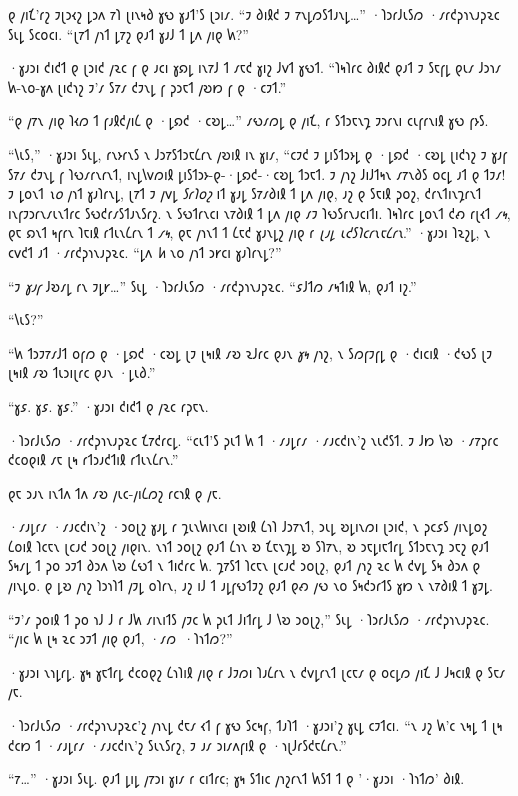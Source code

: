 𐑞 𐑢𐑦𐑗'𐑩𐑟 𐑲𐑚𐑮𐑬𐑟 𐑛𐑮𐑵 𐑳𐑐 𐑚𐑦𐑯𐑰𐑔 𐑣𐑻 𐑣𐑨𐑑'𐑕 𐑚𐑮𐑦𐑥. “𐑲 𐑔𐑦𐑙𐑒 𐑲 𐑳𐑯𐑛𐑼𐑕𐑑𐑨𐑯𐑛…” ·𐑐𐑮𐑩𐑓𐑧𐑕𐑼 ·𐑥𐑩𐑒𐑜𐑪𐑯𐑨𐑜𐑷𐑤 𐑕𐑧𐑛 𐑕𐑤𐑴𐑤𐑦. “𐑚𐑳𐑑 𐑢𐑪𐑑 𐑛𐑳𐑟 𐑞𐑨𐑑 𐑣𐑨𐑓 𐑑 𐑛𐑵 𐑢𐑦𐑞 𐑿?”

·𐑣𐑨𐑮𐑦 𐑒𐑦𐑒𐑑 𐑞 𐑚𐑮𐑦𐑒 𐑢𐑷𐑤 𐑝 𐑞 𐑨𐑤𐑦 𐑣𐑸𐑛 𐑦𐑯𐑳𐑓 𐑑 𐑥𐑱𐑒 𐑣𐑦𐑟 𐑓𐑫𐑑 𐑣𐑻𐑑. “𐑐𐑰𐑐𐑩𐑤 𐑔𐑦𐑙𐑒 𐑞𐑨𐑑 𐑲 𐑕𐑱𐑝𐑛 𐑞𐑧𐑥 𐑓𐑮𐑪𐑥 𐑿-𐑯𐑴-𐑣𐑵 𐑚𐑦𐑒𐑪𐑟 𐑲'𐑥 𐑕𐑳𐑥 𐑒𐑲𐑯𐑛 𐑝 𐑜𐑮𐑱𐑑 𐑢𐑹𐑽 𐑝 𐑞 ·𐑤𐑲𐑑.”

“𐑞 𐑢𐑳𐑯 𐑢𐑦𐑞 𐑐𐑬𐑼 𐑑 𐑝𐑨𐑙𐑒𐑢𐑦𐑖 𐑞 ·𐑛𐑸𐑒 ·𐑤𐑹𐑛…” 𐑥𐑻𐑥𐑼𐑛 𐑞 𐑢𐑦𐑗, 𐑩 𐑕𐑑𐑮𐑱𐑯𐑡 𐑲𐑮𐑩𐑯𐑦 𐑤𐑧𐑝𐑩𐑯𐑦𐑙 𐑣𐑻 𐑝𐑶𐑕.

“𐑘𐑧𐑕,” ·𐑣𐑨𐑮𐑦 𐑕𐑧𐑛, 𐑩𐑯𐑶𐑩𐑯𐑕 𐑯 𐑓𐑮𐑳𐑕𐑑𐑮𐑱𐑖𐑩𐑯 𐑢𐑹𐑦𐑙 𐑦𐑯 𐑣𐑦𐑥, “𐑤𐑲𐑒 𐑲 𐑛𐑦𐑕𐑑𐑮𐑶𐑛 𐑞 ·𐑛𐑸𐑒 ·𐑤𐑹𐑛 𐑚𐑦𐑒𐑪𐑟 𐑲 𐑣𐑨𐑝 𐑕𐑳𐑥 𐑒𐑲𐑯𐑛 𐑝 𐑐𐑻𐑥𐑩𐑯𐑩𐑯𐑑, 𐑦𐑯𐑛𐑘𐑫𐑼𐑦𐑙 𐑛𐑦𐑕𐑑𐑮𐑶-𐑞-·𐑛𐑸𐑒-·𐑤𐑹𐑛 𐑑𐑮𐑱𐑑. 𐑲 𐑢𐑪𐑟 𐑓𐑦𐑓𐑑𐑰𐑯 𐑥𐑳𐑯𐑔𐑕 𐑴𐑤𐑛 𐑨𐑑 𐑞 𐑑𐑲𐑥! 𐑲 𐑛𐑴𐑯𐑑 \emph{𐑯𐑴} 𐑢𐑪𐑑 𐑣𐑨𐑐𐑩𐑯𐑛, 𐑚𐑳𐑑 𐑲 𐑢𐑫𐑛 \emph{𐑕𐑩𐑐𐑴𐑟} 𐑦𐑑 𐑣𐑨𐑛 𐑕𐑳𐑥𐑔𐑦𐑙 𐑑 𐑛𐑵 𐑢𐑦𐑞, 𐑨𐑟 𐑞 𐑕𐑱𐑦𐑙 𐑜𐑴𐑟, 𐑒𐑩𐑯𐑑𐑦𐑯𐑡𐑩𐑯𐑑 𐑦𐑯𐑝𐑲𐑮𐑩𐑯𐑥𐑧𐑯𐑑𐑩𐑤 𐑕𐑻𐑒𐑩𐑥𐑕𐑑𐑨𐑯𐑕𐑩𐑟. 𐑯 𐑕𐑻𐑑𐑩𐑯𐑤𐑦 𐑯𐑳𐑔𐑦𐑙 𐑑 𐑛𐑵 𐑢𐑦𐑞 𐑥𐑲 𐑐𐑻𐑕𐑩𐑯𐑨𐑤𐑦𐑑𐑦. 𐑐𐑰𐑐𐑩𐑤 𐑛𐑴𐑯𐑑 𐑒𐑺 𐑩𐑚𐑬𐑑 \emph{𐑥𐑰}, 𐑞𐑱 𐑸𐑯𐑑 𐑰𐑝𐑩𐑯 𐑐𐑱𐑦𐑙 𐑩𐑑𐑧𐑯𐑖𐑩𐑯 𐑑 \emph{𐑥𐑰}, 𐑞𐑱 𐑢𐑪𐑯𐑑 𐑑 𐑖𐑱𐑒 𐑣𐑨𐑯𐑛𐑟 𐑢𐑦𐑞 𐑩 \emph{𐑚𐑨𐑛 𐑧𐑒𐑕𐑐𐑤𐑩𐑯𐑱𐑖𐑩𐑯}.” ·𐑣𐑨𐑮𐑦 𐑐𐑷𐑟𐑛, 𐑯 𐑤𐑫𐑒𐑑 𐑨𐑑 ·𐑥𐑩𐑒𐑜𐑪𐑯𐑨𐑜𐑷𐑤. “𐑛𐑵 \emph{𐑿} 𐑯𐑴 𐑢𐑪𐑑 𐑮𐑾𐑤𐑦 𐑣𐑨𐑐𐑩𐑯𐑛?”

“𐑲 \emph{𐑣𐑨𐑝} 𐑓𐑹𐑥𐑛 𐑩𐑯 𐑲𐑛𐑾…” 𐑕𐑧𐑛 ·𐑐𐑮𐑩𐑓𐑧𐑕𐑼 ·𐑥𐑩𐑒𐑜𐑪𐑯𐑨𐑜𐑷𐑤. “𐑭𐑓𐑑𐑼 𐑥𐑰𐑑𐑦𐑙 𐑿, 𐑞𐑨𐑑 𐑦𐑟.”

“𐑘𐑧𐑕?”

“𐑿 𐑑𐑮𐑲𐑳𐑥𐑓𐑑 𐑴𐑝𐑼 𐑞 ·𐑛𐑸𐑒 ·𐑤𐑹𐑛 𐑚𐑲 𐑚𐑰𐑦𐑙 𐑥𐑹 𐑷𐑓𐑩𐑤 𐑞𐑨𐑯 \emph{𐑣𐑰} 𐑢𐑪𐑟, 𐑯 𐑕𐑼𐑝𐑲𐑝𐑛 𐑞 ·𐑒𐑦𐑤𐑦𐑙 ·𐑒𐑻𐑕 𐑚𐑲 𐑚𐑰𐑦𐑙 𐑥𐑹 𐑑𐑧𐑮𐑦𐑚𐑩𐑤 𐑞𐑨𐑯 ·𐑛𐑧𐑔.”

“𐑣𐑭. 𐑣𐑭. 𐑣𐑭.” ·𐑣𐑨𐑮𐑦 𐑒𐑦𐑒𐑑 𐑞 𐑢𐑷𐑤 𐑩𐑜𐑱𐑯.

·𐑐𐑮𐑩𐑓𐑧𐑕𐑼 ·𐑥𐑩𐑒𐑜𐑪𐑯𐑨𐑜𐑷𐑤 𐑗𐑳𐑒𐑩𐑤𐑛. “𐑤𐑧𐑑'𐑕 𐑜𐑧𐑑 𐑿 𐑑 ·𐑥𐑨𐑛𐑩𐑥 ·𐑥𐑨𐑤𐑒𐑦𐑯'𐑟 𐑯𐑧𐑒𐑕𐑑. 𐑲 𐑓𐑽 𐑘𐑹 ·𐑥𐑳𐑜𐑩𐑤 𐑒𐑤𐑴𐑞𐑦𐑙 𐑥𐑱 𐑚𐑰 𐑩𐑑𐑮𐑨𐑒𐑑𐑦𐑙 𐑩𐑑𐑧𐑯𐑖𐑩𐑯.”

𐑞𐑱 𐑮𐑨𐑯 𐑦𐑯𐑑𐑵 𐑑𐑵 𐑥𐑹 𐑢𐑧𐑤-𐑢𐑦𐑖𐑼𐑟 𐑩𐑤𐑪𐑙 𐑞 𐑢𐑱.

·𐑥𐑨𐑛𐑩𐑥 ·𐑥𐑨𐑤𐑒𐑦𐑯'𐑟 ·𐑮𐑴𐑚𐑟 𐑣𐑨𐑛 𐑩 𐑡𐑧𐑯𐑿𐑦𐑯𐑤𐑦 𐑚𐑹𐑦𐑙 𐑖𐑪𐑐 𐑓𐑮𐑳𐑯𐑑, 𐑮𐑧𐑛 𐑹𐑛𐑦𐑯𐑼𐑦 𐑚𐑮𐑦𐑒, 𐑯 𐑜𐑤𐑭𐑕 𐑢𐑦𐑯𐑛𐑴𐑟 𐑖𐑴𐑦𐑙 𐑐𐑤𐑱𐑯 𐑚𐑤𐑨𐑒 𐑮𐑴𐑚𐑟 𐑢𐑦𐑞𐑦𐑯. 𐑯𐑪𐑑 𐑮𐑴𐑚𐑟 𐑞𐑨𐑑 𐑖𐑪𐑯 𐑹 𐑗𐑱𐑯𐑡𐑛 𐑹 𐑕𐑐𐑳𐑯, 𐑹 𐑮𐑱𐑛𐑦𐑱𐑑𐑩𐑛 𐑕𐑑𐑮𐑱𐑯𐑡 𐑮𐑱𐑟 𐑞𐑨𐑑 𐑕𐑰𐑥𐑛 𐑑 𐑜𐑴 𐑮𐑲𐑑 𐑔𐑮𐑵 𐑘𐑹 𐑖𐑻𐑑 𐑯 𐑑𐑦𐑒𐑩𐑤 𐑿. 𐑡𐑳𐑕𐑑 𐑐𐑤𐑱𐑯 𐑚𐑤𐑨𐑒 𐑮𐑴𐑚𐑟, 𐑞𐑨𐑑 𐑢𐑪𐑟 𐑷𐑤 𐑿 𐑒𐑫𐑛 𐑕𐑰 𐑔𐑮𐑵 𐑞 𐑢𐑦𐑯𐑛𐑴. 𐑞 𐑛𐑹 𐑢𐑪𐑟 𐑐𐑮𐑪𐑐𐑑 𐑢𐑲𐑛 𐑴𐑐𐑩𐑯, 𐑨𐑟 𐑦𐑓 𐑑 𐑨𐑛𐑝𐑻𐑑𐑲𐑟 𐑞𐑨𐑑 𐑞𐑺 𐑢𐑻 𐑯𐑴 𐑕𐑰𐑒𐑮𐑩𐑑𐑕 𐑣𐑽 𐑯 𐑯𐑳𐑔𐑦𐑙 𐑑 𐑣𐑲𐑛.

“𐑲'𐑥 𐑜𐑴𐑦𐑙 𐑑 𐑜𐑴 𐑪𐑓 𐑓 𐑩 𐑓𐑿 𐑥𐑦𐑯𐑦𐑑𐑕 𐑢𐑲𐑤 𐑿 𐑜𐑧𐑑 𐑓𐑦𐑑𐑩𐑛 𐑓 𐑘𐑹 𐑮𐑴𐑚𐑟,” 𐑕𐑧𐑛 ·𐑐𐑮𐑩𐑓𐑧𐑕𐑼 ·𐑥𐑩𐑒𐑜𐑪𐑯𐑨𐑜𐑷𐑤. “𐑢𐑦𐑤 𐑿 𐑚𐑰 𐑷𐑤 𐑮𐑲𐑑 𐑢𐑦𐑞 𐑞𐑨𐑑, ·𐑥𐑼~·𐑐𐑪𐑑𐑼?”

·𐑣𐑨𐑮𐑦 𐑯𐑪𐑛𐑩𐑛. 𐑣𐑰 𐑣𐑱𐑑𐑩𐑛 𐑒𐑤𐑴𐑞𐑟 𐑖𐑪𐑐𐑦𐑙 𐑢𐑦𐑞 𐑩 𐑓𐑲𐑼𐑦 𐑐𐑨𐑖𐑩𐑯 𐑯 𐑒𐑫𐑛𐑩𐑯𐑑 𐑚𐑤𐑱𐑥 𐑞 𐑴𐑤𐑛𐑼 𐑢𐑦𐑗 𐑓 𐑓𐑰𐑤𐑦𐑙 𐑞 𐑕𐑱𐑥 𐑢𐑱.

·𐑐𐑮𐑩𐑓𐑧𐑕𐑼 ·𐑥𐑩𐑒𐑜𐑪𐑯𐑨𐑜𐑷𐑤'𐑟 𐑢𐑪𐑯𐑛 𐑒𐑱𐑥 𐑬𐑑 𐑝 𐑣𐑻 𐑕𐑤𐑰𐑝, 𐑑𐑨𐑐𐑑 ·𐑣𐑨𐑮𐑦'𐑟 𐑣𐑧𐑛 𐑤𐑲𐑑𐑤𐑦. “𐑯 𐑨𐑟 𐑿'𐑤 𐑯𐑰𐑛 𐑑 𐑚𐑰 𐑒𐑤𐑽 𐑑 ·𐑥𐑨𐑛𐑩𐑥 ·𐑥𐑨𐑤𐑒𐑦𐑯'𐑟 𐑕𐑧𐑯𐑕𐑩𐑟, 𐑲 𐑨𐑥 𐑮𐑦𐑥𐑵𐑝𐑦𐑙 𐑞 ·𐑪𐑚𐑓𐑩𐑕𐑒𐑱𐑖𐑩𐑯.”

“𐑳…” ·𐑣𐑨𐑮𐑦 𐑕𐑧𐑛. 𐑞𐑨𐑑 𐑛𐑦𐑛 𐑢𐑳𐑮𐑦 𐑣𐑦𐑥 𐑩 𐑤𐑦𐑑𐑩𐑤; 𐑣𐑰 𐑕𐑑𐑦𐑤 𐑢𐑪𐑟𐑩𐑯𐑑 𐑿𐑕𐑑 𐑑 𐑞 '·𐑣𐑨𐑮𐑦 ·𐑐𐑪𐑑𐑼' 𐑔𐑦𐑙.

